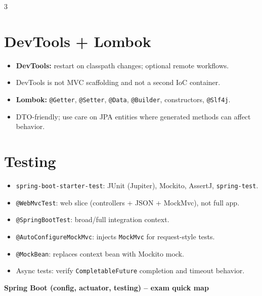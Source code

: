 \begin{multicols}{3}
\section*{DevTools + Lombok}
\begin{itemize}[leftmargin=*, nosep, topsep=0pt]
  \item \textbf{DevTools:} restart on classpath changes; optional remote workflows.
  \item DevTools is not MVC scaffolding and not a second IoC container.
  \item \textbf{Lombok:} \texttt{@Getter}, \texttt{@Setter}, \texttt{@Data}, \texttt{@Builder}, constructors, \texttt{@Slf4j}.
  \item DTO-friendly; use care on JPA entities where generated methods can affect behavior.
\end{itemize}

\section*{Testing}
\begin{itemize}[leftmargin=*, nosep, topsep=0pt]
  \item \texttt{spring-boot-starter-test}: JUnit (Jupiter), Mockito, AssertJ, \texttt{spring-test}.
  \item \texttt{@WebMvcTest}: web slice (controllers + JSON + MockMvc), not full app.
  \item \texttt{@SpringBootTest}: broad/full integration context.
  \item \texttt{@AutoConfigureMockMvc}: injects \texttt{MockMvc} for request-style tests.
  \item \texttt{@MockBean}: replaces context bean with Mockito mock.
  \item Async tests: verify \texttt{CompletableFuture} completion and timeout behavior.
\end{itemize}

\end{multicols}
{\centering\bfseries Spring Boot (config, actuator, testing) -- exam quick map\par}
\vspace{0.35ex}
